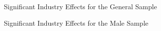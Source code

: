 \begin{figure}[hbtp]
    \caption{Significant Industry Effects for the General Sample} 
\end{figure}

\begin{figure}[hbtp]
    \caption{Significant Industry Effects for the Male Sample} 
\end{figure}



















